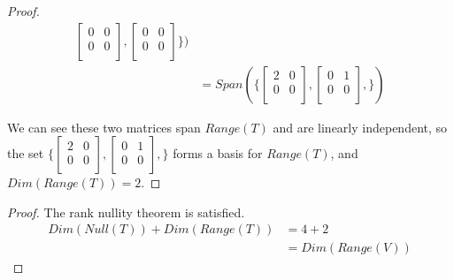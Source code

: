 \documentclass[12pt]{article}
\newenvironment{exercise}[2][Exercise]{\begin{trivlist}
\item[\hskip \labelsep{\bfseries #1}\hskip \labelsep{\bfseries #2.}]}{\end{trivlist}}
\begin{document}
\begin{exercise}{2.1.4}
\begin{proof}
\begin{align*}
                    \begin{bmatrix}
                        0 & 0 \\
                        0 & 0 \\
                    \end{bmatrix},
                    \begin{bmatrix}
                        0 & 0 \\
                        0 & 0 \\
                    \end{bmatrix}
                \}) \\
            &= Span(\{
                    \begin{bmatrix}
                        2 & 0 \\
                        0 & 0 \\
                    \end{bmatrix},
                    \begin{bmatrix}
                        0 & 1 \\
                        0 & 0 \\
                    \end{bmatrix},
                \})
        \end{align*}

        \noindent We can see these two matrices span $Range(T)$ and are linearly independent, so the set
        $\{\begin{bmatrix}
                2 & 0 \\
                0 & 0 \\
            \end{bmatrix},
            \begin{bmatrix}
                0 & 1 \\
                0 & 0 \\
            \end{bmatrix},\}$
        forms a basis for $Range(T)$, and $Dim(Range(T)) = 2$.

    \end{proof}

    \begin{proof} The rank nullity theorem is satisfied. \\

        \begin{align*}
            Dim(Null(T)) + Dim(Range(T))
            &= 4 + 2 \\
            &= Dim(Range(V))
        \end{align*}
        

\end{proof}
\end{exercise}
\end{document}
